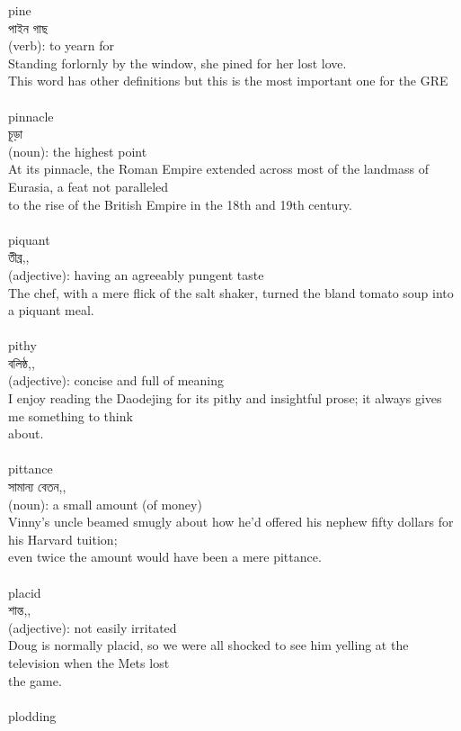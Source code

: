 \documentclass{article}
\begin{document}
{pine}\\
{পাইন গাছ}\\
{(verb): to yearn for\\Standing forlornly by the window, she pined for her lost love.\\This word has other definitions but this is the most important one for the GRE\\}\\
{pinnacle}\\
{চূড়া}\\
{(noun): the highest point\\At its pinnacle, the Roman Empire extended across most of the landmass of Eurasia, a feat not paralleled\\to the rise of the British Empire in the 18th and 19th century.\\}\\
{piquant}\\
{তীব্র,,}\\
{(adjective): having an agreeably pungent taste\\The chef, with a mere flick of the salt shaker, turned the bland tomato soup into a piquant meal.\\}\\
{pithy}\\
{বলিষ্ঠ,,}\\
{(adjective): concise and full of meaning\\I enjoy reading the Daodejing for its pithy and insightful prose; it always gives me something to think\\about.\\}\\
{pittance}\\
{সামান্য বেতন,,}\\
{(noun): a small amount (of money)\\Vinny's uncle beamed smugly about how he'd offered his nephew fifty dollars for his Harvard tuition;\\even twice the amount would have been a mere pittance.\\}\\
{placid}\\
{শান্ত,,}\\
{(adjective): not easily irritated\\Doug is normally placid, so we were all shocked to see him yelling at the television when the Mets lost\\the game.\\}\\
{plodding}\\
\end{document}
